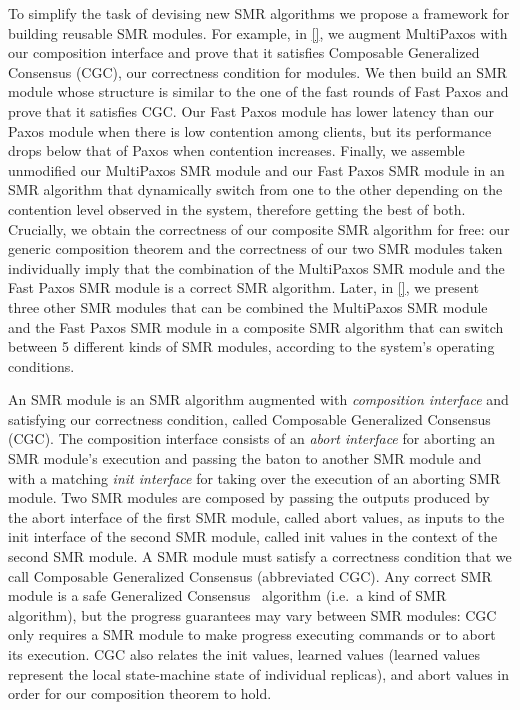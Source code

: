To simplify the task of devising new SMR algorithms we propose a framework
for building reusable SMR modules. For example, in \cref{}, we augment
MultiPaxos with our composition interface and prove that it satisfies Composable
Generalized Consensus (CGC), our correctness condition for modules. We then
build an SMR module whose structure is similar to the one of the fast rounds of
Fast Paxos and prove that it satisfies CGC\@. Our Fast Paxos module has lower
latency than our Paxos module when there is low contention among clients, but
its performance drops below that of Paxos when contention increases. Finally,
we assemble unmodified our MultiPaxos SMR module and our Fast Paxos SMR module
in an SMR algorithm that dynamically switch from one to the other depending on
the contention level observed in the system, therefore getting the best of both.
Crucially, we obtain the correctness of our composite SMR algorithm for free:
our generic composition theorem and the correctness of our two SMR modules taken
individually imply that the combination of the MultiPaxos SMR module and the
Fast Paxos SMR module is a correct SMR algorithm. Later, in \cref{}, we present
three other SMR modules that can be combined the MultiPaxos SMR module and the
Fast Paxos SMR module in a composite SMR algorithm that can switch between 5
different kinds of SMR modules, according to the system's operating conditions.

An SMR module is an SMR algorithm augmented with \emph{composition interface}
and satisfying our correctness condition, called Composable Generalized
Consensus (CGC). The composition interface consists of an \emph{abort interface}
for aborting an SMR module's execution and passing the baton to another
SMR module and with a matching \emph{init interface} for taking over the
execution of an aborting SMR module. Two SMR modules are composed by passing
the outputs produced by the abort interface of the first SMR module, called
abort values, as inputs to the init interface of the second SMR module,
called init values in the context of the second SMR module. A SMR module
must satisfy a correctness condition that we call Composable Generalized
Consensus (abbreviated CGC). Any correct SMR module is a safe Generalized
Consensus~\cite{Lamport05GeneralizeConsensus} algorithm (i.e.\ a kind of SMR
algorithm), but the progress guarantees may vary between SMR modules: CGC only
requires a SMR module to make progress executing commands or to abort its
execution. CGC also relates the init values, learned values (learned values
represent the local state-machine state of individual replicas), and abort
values in order for our composition theorem to hold.



